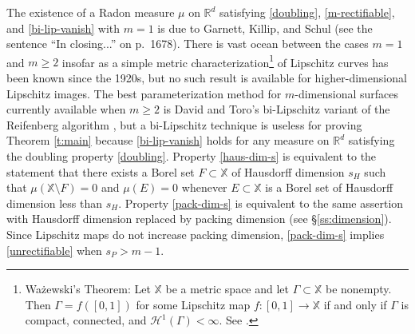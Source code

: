 \documentclass[12pt]{amsart}
\theoremstyle{definition}
\theoremstyle{remark}
\newcommand{\RR}{\mathbb{R}}
\newcommand{\XX}{\mathbb{X}}
\newcommand{\Haus}{\mathcal{H}}
\numberwithin{figure}{section}
\numberwithin{equation}{section}
\begin{document}
The existence of a Radon measure $\mu$ on $\RR^d$ satisfying \eqref{doubling}, \eqref{m-rectifiable}, and \eqref{bi-lip-vanish} with $m=1$ is due to Garnett, Killip, and Schul \cite{GKS} (see the sentence ``In closing...'' on p.~1678). There is vast ocean between the cases $m=1$ and $m\geq 2$ insofar as a simple metric characterization\footnote{Wa\.zewski's Theorem: Let $\XX$ be a metric space and let $\Gamma\subset \XX$ be nonempty. Then $\Gamma=f([0,1])$ for some Lipschitz map $f:[0,1]\rightarrow\XX$ if and only if $\Gamma$ is compact, connected, and $\Haus^1(\Gamma)<\infty$. See \cite{AO-curves}.} of Lipschitz curves has been known since the 1920s, but no such result is available for higher-dimensional Lipschitz images. The best parameterization method for $m$-dimensional surfaces currently available when $m\geq 2$ is David and Toro's bi-Lipschitz variant of the Reifenberg algorithm \cite{DT,ENV-Banach}, but a bi-Lipschitz technique is useless for proving Theorem \ref{t:main} because \eqref{bi-lip-vanish} holds for any measure on $\RR^d$ satisfying the doubling property \eqref{doubling}. Property \eqref{haus-dim-s} is equivalent to the statement that there exists a Borel set $F\subset\XX$ of Hausdorff dimension $s_H$ such that $\mu(\XX\setminus F)=0$ and $\mu(E)=0$ whenever $E\subset\XX$ is a Borel set of Hausdorff dimension less than $s_H$. Property \eqref{pack-dim-s} is equivalent to the same assertion with Hausdorff dimension replaced by packing dimension (see \S\ref{ss:dimension}). Since Lipschitz maps do not increase packing dimension, \eqref{pack-dim-s} implies \eqref{unrectifiable} when $s_P>m-1$.
\end{document}
